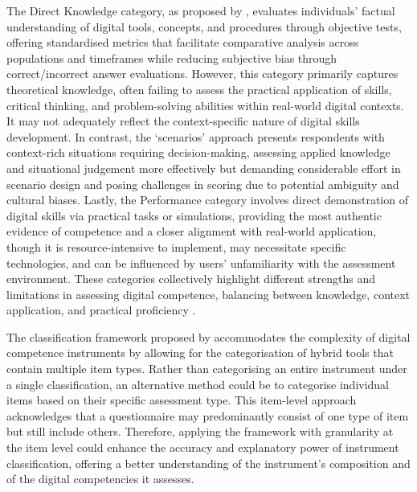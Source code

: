 \documentclass[english]{textolivre}
\begin{document}
The Direct Knowledge category, as proposed by \textcite{mattar2022digcomp}, evaluates individuals’ factual understanding of digital tools, concepts, and procedures through objective tests, offering standardised metrics that facilitate comparative analysis across populations and timeframes while reducing subjective bias through correct/incorrect answer evaluations. However, this category primarily captures theoretical knowledge, often failing to assess the practical application of skills, critical thinking, and problem-solving abilities within real-world digital contexts. It may not adequately reflect the context-specific nature of digital skills development. In contrast, the ‘scenarios’ approach presents respondents with context-rich situations requiring decision-making, assessing applied knowledge and situational judgement more effectively but demanding considerable effort in scenario design and posing challenges in scoring due to potential ambiguity and cultural biases. Lastly, the Performance category involves direct demonstration of digital skills via practical tasks or simulations, providing the most authentic evidence of competence and a closer alignment with real-world application, though it is resource-intensive to implement, may necessitate specific technologies, and can be influenced by users’ unfamiliarity with the assessment environment. These categories collectively highlight different strengths and limitations in assessing digital competence, balancing between knowledge, context application, and practical proficiency \cite{redecker2017digcompedu}.

The classification framework proposed by \textcite{mattar2022digcomp} accommodates the complexity of digital competence instruments by allowing for the categorisation of hybrid tools that contain multiple item types. Rather than categorising an entire instrument under a single classification, an alternative method could be to categorise individual items based on their specific assessment type. This item-level approach acknowledges that a questionnaire may predominantly consist of one type of item but still include others. Therefore, applying the  framework with granularity at the item level could enhance the accuracy and explanatory power of instrument classification, offering a better understanding of the instrument’s composition and of the digital competencies it assesses.
\end{document}
